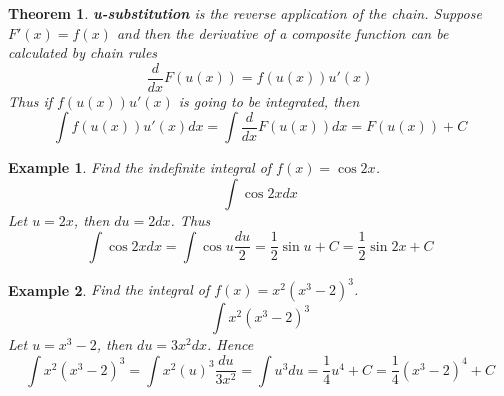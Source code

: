 \documentclass{article}
\newtheorem{ex}{Example}
\newtheorem{thm}{Theorem}
\begin{document}
\begin{thm}
	\textbf{u-substitution} is the reverse application of the chain. Suppose $F'(x) = f(x)$ and then the derivative of a composite function can be calculated by chain rules
	\[ \frac{d}{dx}F(u(x)) = f(u(x))u'(x) \]
	Thus if $f(u(x))u'(x)$ is going to be integrated, then
	\[ \int f(u(x))u'(x) dx = \int \frac{d}{dx}F(u(x)) dx = F(u(x)) +C \]
\end{thm}

\begin{ex}
	Find the indefinite integral of $f(x) = \cos 2x$.
	\[ \int \cos2x dx \]
	Let $u=2x$, then $du = 2dx$. Thus
	\[ \int \cos2x dx = \int \cos u \frac{du}{2} = \frac{1}{2}\sin u +C= \frac{1}{2}\sin 2x +C\]
\end{ex}

\begin{ex}
	Find the integral of $f(x) = x^2(x^3-2)^3$.
	\[ \int x^2(x^3-2)^3  \]
	Let $u = x^3-2$, then $du = 3x^2dx$. Hence
	\[ \int x^2(x^3-2)^3 = \int x^2(u)^3 \frac{du}{3x^2} = \int u^3 du = \frac{1}{4}u^4 + C   = \frac{1}{4}(x^3-2)^4 +C \]
\end{ex}
\end{document}
